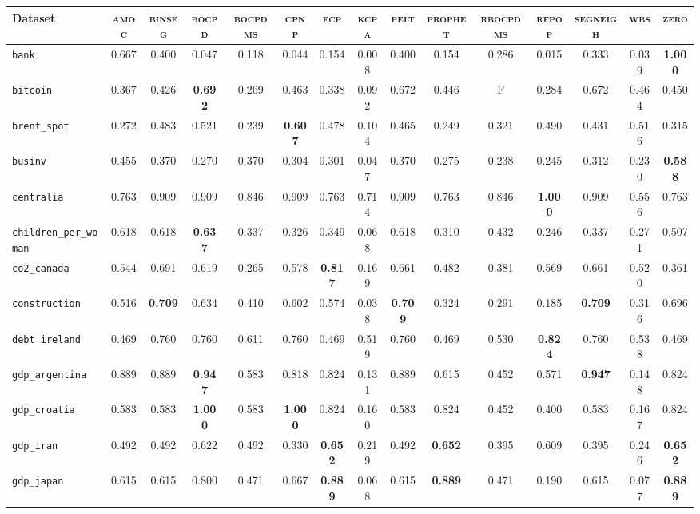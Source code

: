 \begin{tabular}{lcccccccccccccc}
Dataset & \textsc{amoc} & \textsc{binseg} & \textsc{bocpd} & \textsc{bocpdms} & \textsc{cpnp} & \textsc{ecp} & \textsc{kcpa} & \textsc{pelt} & \textsc{prophet} & \textsc{rbocpdms} & \textsc{rfpop} & \textsc{segneigh} & \textsc{wbs} & \textsc{zero}\\
\toprule
\verb+bank+ & 0.667 & 0.400 & 0.047 & 0.118 & 0.044 & 0.154 & 0.008 & 0.400 & 0.154 & 0.286 & 0.015 & 0.333 & 0.039 & \textbf{1.000}\\
\verb+bitcoin+ & 0.367 & 0.426 & \textbf{0.692} & 0.269 & 0.463 & 0.338 & 0.092 & 0.672 & 0.446 & F & 0.284 & 0.672 & 0.464 & 0.450\\
\verb+brent_spot+ & 0.272 & 0.483 & 0.521 & 0.239 & \textbf{0.607} & 0.478 & 0.104 & 0.465 & 0.249 & 0.321 & 0.490 & 0.431 & 0.516 & 0.315\\
\verb+businv+ & 0.455 & 0.370 & 0.270 & 0.370 & 0.304 & 0.301 & 0.047 & 0.370 & 0.275 & 0.238 & 0.245 & 0.312 & 0.230 & \textbf{0.588}\\
\verb+centralia+ & 0.763 & 0.909 & 0.909 & 0.846 & 0.909 & 0.763 & 0.714 & 0.909 & 0.763 & 0.846 & \textbf{1.000} & 0.909 & 0.556 & 0.763\\
\verb+children_per_woman+ & 0.618 & 0.618 & \textbf{0.637} & 0.337 & 0.326 & 0.349 & 0.068 & 0.618 & 0.310 & 0.432 & 0.246 & 0.337 & 0.271 & 0.507\\
\verb+co2_canada+ & 0.544 & 0.691 & 0.619 & 0.265 & 0.578 & \textbf{0.817} & 0.169 & 0.661 & 0.482 & 0.381 & 0.569 & 0.661 & 0.520 & 0.361\\
\verb+construction+ & 0.516 & \textbf{0.709} & 0.634 & 0.410 & 0.602 & 0.574 & 0.038 & \textbf{0.709} & 0.324 & 0.291 & 0.185 & \textbf{0.709} & 0.316 & 0.696\\
\verb+debt_ireland+ & 0.469 & 0.760 & 0.760 & 0.611 & 0.760 & 0.469 & 0.519 & 0.760 & 0.469 & 0.530 & \textbf{0.824} & 0.760 & 0.538 & 0.469\\
\verb+gdp_argentina+ & 0.889 & 0.889 & \textbf{0.947} & 0.583 & 0.818 & 0.824 & 0.131 & 0.889 & 0.615 & 0.452 & 0.571 & \textbf{0.947} & 0.148 & 0.824\\
\verb+gdp_croatia+ & 0.583 & 0.583 & \textbf{1.000} & 0.583 & \textbf{1.000} & 0.824 & 0.160 & 0.583 & 0.824 & 0.452 & 0.400 & 0.583 & 0.167 & 0.824\\
\verb+gdp_iran+ & 0.492 & 0.492 & 0.622 & 0.492 & 0.330 & \textbf{0.652} & 0.219 & 0.492 & \textbf{0.652} & 0.395 & 0.609 & 0.395 & 0.246 & \textbf{0.652}\\
\verb+gdp_japan+ & 0.615 & 0.615 & 0.800 & 0.471 & 0.667 & \textbf{0.889} & 0.068 & 0.615 & \textbf{0.889} & 0.471 & 0.190 & 0.615 & 0.077 & \textbf{0.889}\\

\end{tabular}
